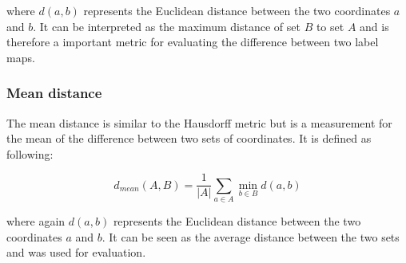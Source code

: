 where $d(a,b)$ represents the Euclidean distance between the two coordinates $a$ and $b$. It can be interpreted as the maximum distance of set $B$ to set $A$ and is therefore a important metric for evaluating the difference between two label maps.

\subsubsection{Mean distance}
The mean distance is similar to the Hausdorff metric but is a measurement for the mean of the difference between two sets of coordinates.\newline
It is defined as following:

\begin{equation}
	d_{mean} (A,B) = \frac{1}{|A|} \sum_{a \in A} \min_{b \in B} d(a,b)
\end{equation}

where again $d(a,b)$ represents the Euclidean distance between the two coordinates $a$ and $b$. It can be seen as the average distance between the two sets and was used for evaluation.
